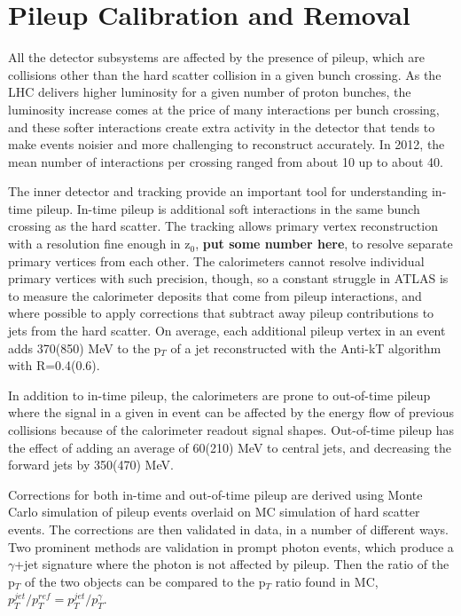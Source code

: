 \section{Pileup Calibration and Removal}
All the detector subsystems are affected by the presence of pileup, which are collisions other than the hard scatter collision in a given bunch crossing.  As the LHC delivers higher luminosity for a given number of proton bunches, the luminosity increase comes at the price of many interactions per bunch crossing, and these softer interactions create extra activity in the detector that tends to make events noisier and more challenging to reconstruct accurately.  In 2012, the mean number of interactions per crossing ranged from about 10 up to about 40.  

The inner detector and tracking provide an important tool for understanding in-time pileup.  In-time pileup is additional soft interactions in the same bunch crossing as the hard scatter.  The tracking allows primary vertex reconstruction with a resolution fine enough in z$_0$, \textbf{put some number here}, to resolve separate primary vertices from each other.   The calorimeters cannot resolve individual primary vertices with such precision, though, so a constant struggle in ATLAS is to measure the calorimeter deposits that come from pileup interactions, and where possible to apply corrections that subtract away pileup contributions to jets from the hard scatter.  On average, each additional pileup vertex in an event adds 370(850) MeV to the p$_T$ of a jet reconstructed with the Anti-kT algorithm with R=0.4(0.6).

In addition to in-time pileup, the calorimeters are prone to out-of-time pileup where the signal in a given in event can be affected by the energy flow of previous collisions because of the calorimeter readout signal shapes.  Out-of-time pileup has the effect of adding an average of 60(210) MeV to central jets, and decreasing the forward jets by 350(470) MeV.  

Corrections for both in-time and out-of-time pileup are derived using Monte Carlo simulation of pileup events overlaid on MC simulation of hard scatter events.  The corrections are then validated in data, in a number of different ways.  Two prominent methods are validation in prompt photon events, which produce a $\gamma$+jet signature where the photon is not affected by pileup.  Then the ratio of the p$_T$ of the two objects can be compared to the p$_T$ ratio found in MC, $p^{jet}_T/p^{ref}_T = p^{jet}_T/p^{\gamma}_T$.

